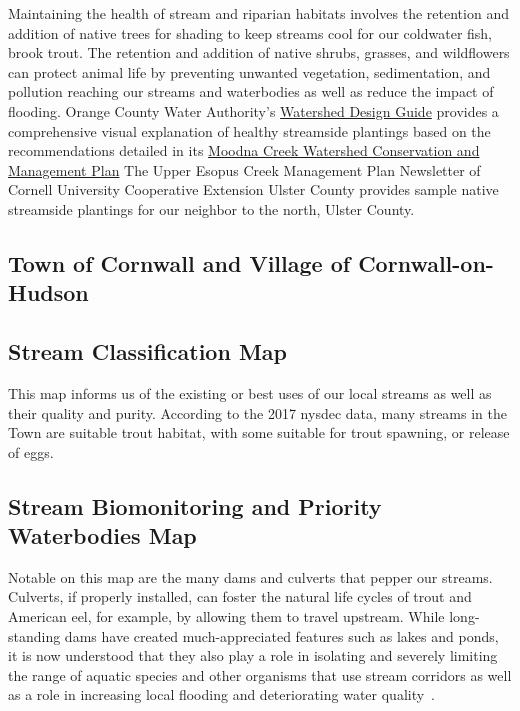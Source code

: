 Maintaining the health of stream and riparian habitats involves the retention
and addition of native trees for shading to keep streams cool for our coldwater
fish, brook trout. The retention and addition of native shrubs, grasses, and
wildflowers can protect animal life by preventing unwanted vegetation,
sedimentation, and pollution reaching our streams and waterbodies as well as
reduce the impact of flooding. Orange County Water Authority's
\href{https://www.orangecountygov.com/DocumentCenter/View/4135/Watershed-Design-Guide-2014-PDF}
{Watershed Design Guide} provides a comprehensive visual explanation of healthy
streamside plantings based on the recommendations detailed in its
\href{https://www.orangecountygov.com/DocumentCenter/View/4133/Moodna-Creek-Watershed-Conservation-and-Management-Plan-2010-PDF}{Moodna Creek Watershed Conservation and Management Plan}
The Upper Esopus Creek Management Plan Newsletter of Cornell University Cooperative 
Extension Ulster County provides sample native streamside plantings for our 
neighbor to the north, Ulster County.

\subsection*{Town of Cornwall and Village of Cornwall-on-Hudson}
\subsection*{Stream Classification Map}
This map informs us of the existing or best uses of our local streams as well
as their quality and purity. According to the 2017 \gls{nysdec} data, many
streams in the Town are suitable trout habitat, with some suitable for trout
spawning, or release of eggs.

\subsection*{Stream Biomonitoring and Priority Waterbodies Map}
Notable on this map are the many dams and culverts that pepper our streams.
Culverts, if properly installed, can foster the natural life cycles of trout
and American eel, for example, by allowing them to travel upstream. While
long-standing dams have created much-appreciated features such as lakes and
ponds, it is now understood that they also play a role in isolating and
severely limiting the range of aquatic species and other organisms that use
stream corridors as well as a role in increasing local flooding and
deteriorating water quality~\citep{haeckel2014}.

